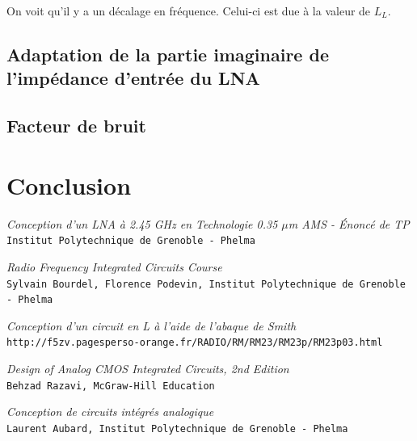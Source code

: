 \documentclass[a4paper]{article}
\begin{document}
On voit qu'il y a un d\'ecalage en fr\'equence. Celui-ci est due \`a la valeur de $L_L$. 



\clearpage

\subsection{Adaptation de la partie imaginaire de l'imp\'edance d'entr\'ee du LNA}
\subsection{Facteur de bruit}

\clearpage
\section*{Conclusion}




\begin{thebibliography}{9}

\textit{Conception d'un LNA \`a 2.45 GHz en Technologie 0.35 $\mu$m AMS - \'Enonc\'e de TP}\\
\texttt{Institut Polytechnique de Grenoble - Phelma}

\textit{Radio Frequency Integrated Circuits Course}\\
\texttt{Sylvain Bourdel, Florence Podevin, Institut Polytechnique de Grenoble - Phelma}

\textit{Conception d'un circuit en L \`a l'aide de l'abaque de Smith}\\
\texttt{http://f5zv.pagesperso-orange.fr/RADIO/RM/RM23/RM23p/RM23p03.html}

\textit{Design of Analog CMOS Integrated Circuits, 2nd Edition}\\
\texttt{Behzad Razavi, McGraw-Hill Education}

\textit{Conception de circuits int\'egr\'es analogique}\\
\texttt{Laurent Aubard, Institut Polytechnique de Grenoble - Phelma}

\end{thebibliography}
\end{document}
